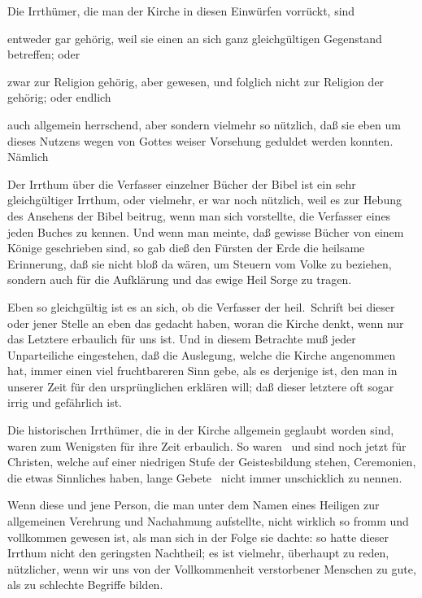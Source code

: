 Die Irrthümer, die man der Kirche in diesen Einwürfen vorrückt, sind
\begin{aufzb}
\item entweder gar  gehörig, weil sie einen an sich ganz gleichgültigen Gegenstand betreffen; oder
\item zwar zur Religion gehörig, aber  gewesen, und folglich nicht zur Religion der  gehörig; oder endlich
\item auch allgemein herrschend, aber  sondern vielmehr so nützlich, daß sie eben um dieses Nutzens wegen von Gottes weiser Vorsehung geduldet werden konnten. Nämlich
\end{aufzb}
\begin{aufza}
\item Der Irrthum über die Verfasser einzelner Bücher der Bibel ist ein sehr gleichgültiger Irrthum, oder vielmehr, er war noch nützlich, weil es zur Hebung des Ansehens der Bibel beitrug, wenn man sich vorstellte, die Verfasser eines jeden Buches zu kennen. Und wenn man meinte, daß gewisse Bücher von einem Könige geschrieben sind, so gab dieß den Fürsten der Erde die heilsame Erinnerung, daß sie nicht bloß da wären, um Steuern vom Volke zu beziehen, sondern auch für die Aufklärung und das ewige Heil  Sorge zu tragen.
\item Eben so gleichgültig ist es an sich, ob die Verfasser der heil.\ Schrift bei dieser oder jener Stelle an eben das gedacht haben, woran die Kirche denkt, wenn nur das Letztere erbaulich für uns ist. Und in diesem Betrachte muß jeder Unparteiliche eingestehen, daß die Auslegung, welche die Kirche angenommen hat, immer einen viel fruchtbareren Sinn gebe, als es derjenige ist, den man in unserer Zeit für den ursprünglichen erklären will; daß dieser letztere oft sogar irrig und gefährlich ist.
\item Die historischen Irrthümer, die in der Kirche allgemein geglaubt worden sind, waren zum Wenigsten für ihre Zeit erbaulich. So waren \zB\ und sind noch jetzt für Christen, welche auf einer niedrigen Stufe der Geistesbildung stehen, Ceremonien, die etwas Sinnliches haben, lange Gebete \udgl\ nicht immer unschicklich zu nennen.
\item Wenn diese und jene Person, die man unter dem Namen eines Heiligen zur allgemeinen Verehrung und Nachahmung aufstellte, nicht wirklich so fromm und vollkommen gewesen ist, als man sich in der Folge sie dachte: so hatte dieser Irrthum nicht den geringsten Nachtheil; es ist vielmehr, überhaupt zu reden, nützlicher, wenn wir uns von der Vollkommenheit verstorbener Menschen zu gute, als zu schlechte Begriffe bilden.

\end{aufza}
